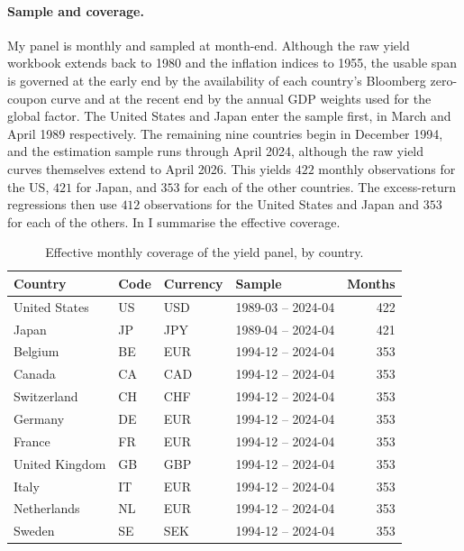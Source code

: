 \paragraph{Sample and coverage.}
\label{sec:data-coverage}
My panel is monthly and sampled at month-end. Although the raw yield workbook
extends back to 1980 and the inflation indices to 1955, the usable span is
governed at the early end by the availability of each country's Bloomberg
zero-coupon curve and at the recent end by the annual GDP weights used for the
global factor. The United States and Japan enter the sample first, in March and
April 1989 respectively. The remaining nine countries begin in December 1994,
and the estimation sample runs through April 2024, although the raw yield curves
themselves extend to April 2026. This yields $422$ monthly
observations for the US, $421$ for Japan, and $353$ for each of the other
countries. The excess-return regressions then use $412$ observations for the
United States and Japan and $353$ for each of the others. In
 I summarise the effective coverage.

\begin{table}[t]\centering
  \caption{Effective monthly coverage of the yield panel, by country.}
  \label{tab:data-coverage}
  \small
  \begin{tabular}{llll r}
    \toprule
    Country & Code & Currency & Sample & Months\\
    \midrule
    United States & US & USD & 1989-03 -- 2024-04 & 422\\
    Japan         & JP & JPY & 1989-04 -- 2024-04 & 421\\
    Belgium       & BE & EUR & 1994-12 -- 2024-04 & 353\\
    Canada        & CA & CAD & 1994-12 -- 2024-04 & 353\\
    Switzerland   & CH & CHF & 1994-12 -- 2024-04 & 353\\
    Germany       & DE & EUR & 1994-12 -- 2024-04 & 353\\
    France        & FR & EUR & 1994-12 -- 2024-04 & 353\\
    United Kingdom& GB & GBP & 1994-12 -- 2024-04 & 353\\
    Italy         & IT & EUR & 1994-12 -- 2024-04 & 353\\
    Netherlands   & NL & EUR & 1994-12 -- 2024-04 & 353\\
    Sweden        & SE & SEK & 1994-12 -- 2024-04 & 353\\
    \bottomrule
  \end{tabular}
\end{table}


